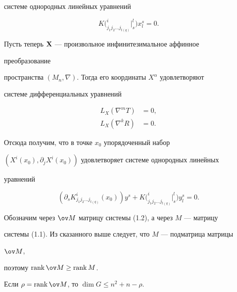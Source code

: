 системе однородных линейных уравнений 


\begin{equation} 


K\big(^i_{j_1j_2\dotsc j_{t(q)}} \big|^l_s \big)x^s_l=0. 


\end{equation} 


 


Пусть теперь $\bold X$ --- произвольное инфинитезимальное аффинное 


преобразование  


пространства $(M_n,\nabla)$. Тогда его координаты $X^\alpha$ удовлетворяют  


системе дифференциальных уравнений 


\begin{align*} 


L_X(\nabla^m T)&=0,\\ 


L_X(\nabla^k R)&=0. 


\end{align*} 


Отсюда получим, что в точке $x_0$ упорядоченный набор  


$(X^i(x_0),\partial_j X^i(x_0))$ удовлетворяет системе однородных линейных 


уравнений 


\begin{equation} 


(\partial_s K^i_{j_1j_2\dotsc j_{t(q)}}(x_0))y^s+ 


K\big(^i_{j_1j_2\dotsc j_{t(q)}} \big|^l_s \big)y^s_l=0. 


\end{equation} 


 


Обозначим через $\ov M$ матрицу системы (1.2), а через $M$ --- матрицу  


системы (1.1). Из сказанного выше следует, что $M$ --- подматрица матрицы 


$\ov M$,  


поэтому $\rank\ov M\ge\rank M$. 


 


\begin{props} 


Если $\rho=\rank\ov M$, то $\dim G\le n^2+n-\rho$. 


\end{props} 


